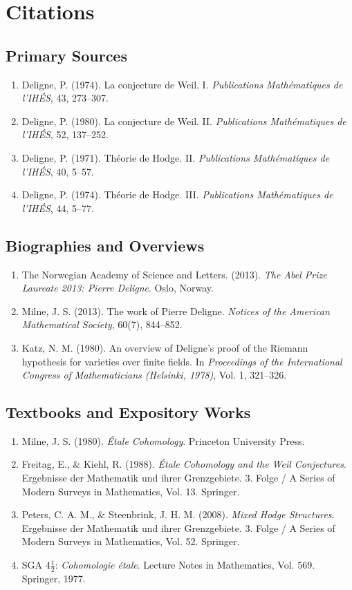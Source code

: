 \section{Citations}

\subsection*{Primary Sources}
\begin{enumerate}
    \item Deligne, P. (1974). La conjecture de Weil. I. \textit{Publications Mathématiques de l'IHÉS}, 43, 273--307.
    \item Deligne, P. (1980). La conjecture de Weil. II. \textit{Publications Mathématiques de l'IHÉS}, 52, 137--252.
    \item Deligne, P. (1971). Théorie de Hodge. II. \textit{Publications Mathématiques de l'IHÉS}, 40, 5--57.
    \item Deligne, P. (1974). Théorie de Hodge. III. \textit{Publications Mathématiques de l'IHÉS}, 44, 5--77.
\end{enumerate}

\subsection*{Biographies and Overviews}
\begin{enumerate}
    \item The Norwegian Academy of Science and Letters. (2013). \textit{The Abel Prize Laureate 2013: Pierre Deligne}. Oslo, Norway.
    \item Milne, J. S. (2013). The work of Pierre Deligne. \textit{Notices of the American Mathematical Society}, 60(7), 844--852.
    \item Katz, N. M. (1980). An overview of Deligne's proof of the Riemann hypothesis for varieties over finite fields. In \textit{Proceedings of the International Congress of Mathematicians (Helsinki, 1978)}, Vol. 1, 321--326.
\end{enumerate}

\subsection*{Textbooks and Expository Works}
\begin{enumerate}
    \item Milne, J. S. (1980). \textit{\'Etale Cohomology}. Princeton University Press.
    \item Freitag, E., \& Kiehl, R. (1988). \textit{\'Etale Cohomology and the Weil Conjectures}. Ergebnisse der Mathematik und ihrer Grenzgebiete. 3. Folge / A Series of Modern Surveys in Mathematics, Vol. 13. Springer.
    \item Peters, C. A. M., \& Steenbrink, J. H. M. (2008). \textit{Mixed Hodge Structures}. Ergebnisse der Mathematik und ihrer Grenzgebiete. 3. Folge / A Series of Modern Surveys in Mathematics, Vol. 52. Springer.
    \item SGA 4$\frac{1}{2}$: \textit{Cohomologie \'etale}. Lecture Notes in Mathematics, Vol. 569. Springer, 1977.
\end{enumerate}
